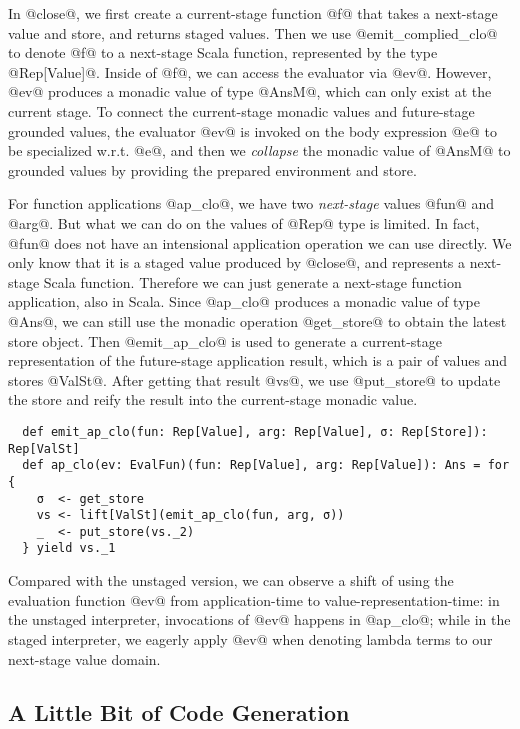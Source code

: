 In @close@, we first create a current-stage function @f@ that takes a
next-stage value and store, and returns staged values. Then we use
@emit_complied_clo@ to denote @f@ to a next-stage Scala function, represented
by the type @Rep[Value]@. Inside of @f@, we can access the evaluator via @ev@.
However, @ev@ produces a monadic value of type @AnsM@, which can only exist at
the current stage. To connect the current-stage monadic values and future-stage
grounded values, the evaluator @ev@ is invoked on the body expression @e@ to be
specialized w.r.t. @e@, and then we \textit{collapse} the monadic value of
@AnsM@ to grounded values by providing the prepared environment and store.

For function applications @ap_clo@, we have two \textit{next-stage} values @fun@
and @arg@. But what we can do on the values of @Rep@ type is limited. In fact, @fun@ does
not have an intensional application operation we can use directly. We only know
that it is a staged value produced by @close@, and represents a
next-stage Scala function. Therefore we can just generate a next-stage function
application, also in Scala. Since @ap_clo@ produces a monadic value of type
@Ans@, we can still use the monadic operation @get_store@ to obtain the latest
store object. Then @emit_ap_clo@ is used to generate a current-stage
representation of the future-stage application result, which is a pair of values
and stores @ValSt@. After getting that result @vs@, we use @put_store@ to
update the store and reify the result into the current-stage monadic value.
\begin{lstlisting}
  def emit_ap_clo(fun: Rep[Value], arg: Rep[Value], σ: Rep[Store]): Rep[ValSt]
  def ap_clo(ev: EvalFun)(fun: Rep[Value], arg: Rep[Value]): Ans = for {
    σ  <- get_store
    vs <- lift[ValSt](emit_ap_clo(fun, arg, σ))
    _  <- put_store(vs._2)
  } yield vs._1
\end{lstlisting}

Compared with the unstaged version, we can observe a shift of using the
evaluation function @ev@ from application-time to value-representation-time: in
the unstaged interpreter, invocations of @ev@ happens in @ap_clo@; while in the
staged interpreter, we eagerly apply @ev@ when denoting lambda terms to our
next-stage value domain.

\subsection{A Little Bit of Code Generation}

